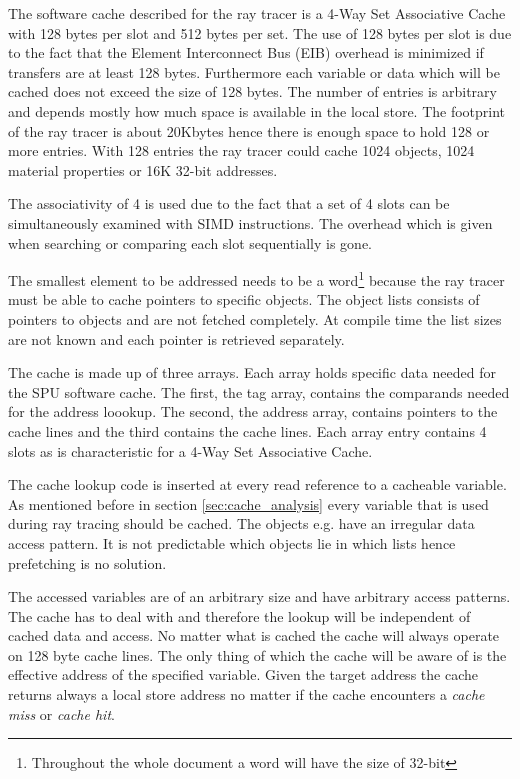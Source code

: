 \documentclass[DIV10, abstracton, openright, footsepline, headsepline, twoside, 9pt,
bigheadings]{scrreprt}
\begin{document}
The software cache described for the ray tracer is a 4-Way Set Associative Cache
with 128 bytes
per slot and 512 bytes per set. The use of 128 bytes per slot is due to the fact
that the Element Interconnect Bus (EIB) overhead is minimized if transfers are at
least 128 bytes. Furthermore each variable or data which will be cached does not
exceed the size of 128 bytes. The number of entries is arbitrary and depends
mostly how much space is available in the local store. The footprint of the ray
tracer is about 20Kbytes hence there is enough space to hold 128 or more entries.
With 128 entries the ray tracer could cache 1024 objects, 1024 material properties
or 16K 32-bit addresses.

\label{sec:assoc}
The associativity of 4 is used due to the fact that a set of 4 slots can be
simultaneously examined with SIMD instructions.  The overhead which is given
when searching or comparing each slot sequentially is gone.

The smallest element to be addressed needs to be a word\footnote{Throughout the
whole document a word will have the size of 32-bit}
 because the ray tracer
must be able to cache pointers to specific objects. The object lists consists of
pointers to objects and are not fetched completely. At compile time the list sizes
are not known and each pointer is retrieved separately.

The cache is made up of three arrays. Each array holds specific data needed for
the SPU software cache. The first, the tag array, contains the comparands needed
for the address loookup.  The second, the address array,  contains pointers to
the cache lines and the third contains the cache lines. Each array entry contains
4 slots as is characteristic for a 4-Way Set Associative Cache.

The cache lookup code is inserted at every read reference to a cacheable
variable. As mentioned before in section \ref{sec:cache_analysis} every variable
that is used during ray tracing should be cached. The objects e.g. have an
irregular data access pattern. It is not predictable which objects lie in which
lists hence prefetching is no solution.

The accessed variables are of an arbitrary size and have arbitrary access patterns.
The cache has to deal with and therefore the lookup will be independent of cached data
and access. No matter what is cached the cache will always operate on 128 byte
cache lines. The only thing of which the cache will be aware of is the effective
address of the specified variable. Given the target address the cache returns
always a local store address no matter if the cache encounters a
\textit{cache miss} or \textit{cache hit}.
\end{document}
